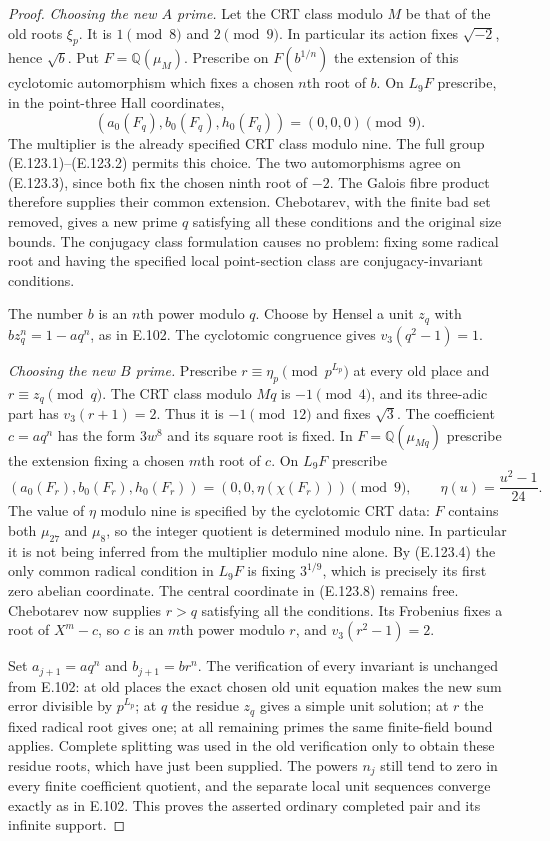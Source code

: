 \begin{proof}
\emph{Choosing the new $A$ prime.}
Let the CRT class modulo $M$ be that of the old roots $\xi_p$.
It is $1\pmod8$ and $2\pmod9$. In particular its action fixes
$\sqrt{-2}$, hence $\sqrt b$. Put $F=\mathbb Q(\mu_M)$.
Prescribe on $F(b^{1/n})$ the extension of this cyclotomic
automorphism which fixes a chosen $n$th root of $b$.
On $L_9F$ prescribe, in the point-three Hall coordinates,
\[
 (a_0(F_q),b_0(F_q),h_0(F_q))=(0,0,0)\pmod9.
 \tag{E.123.7}
\]
The multiplier is the already specified CRT class modulo nine.
The full group (E.123.1)--(E.123.2) permits this choice. The two
automorphisms agree on (E.123.3), since both fix the chosen ninth
root of $-2$. The Galois fibre product therefore supplies their
common extension. Chebotarev, with the finite bad set removed,
gives a new prime $q$ satisfying all these conditions and the
original size bounds. The conjugacy class formulation causes no
problem: fixing some radical root and having the specified local
point-section class are conjugacy-invariant conditions.

The number $b$ is an $n$th power modulo $q$. Choose by Hensel
a unit $z_q$ with $b z_q^n=1-aq^n$, as in E.102.
The cyclotomic congruence gives $v_3(q^2-1)=1$.

\emph{Choosing the new $B$ prime.}
Prescribe $r\equiv\eta_p\pmod{p^{L_p}}$ at every old place
and $r\equiv z_q\pmod q$. The CRT class modulo $Mq$ is
$-1\pmod4$, and its three-adic part has
$v_3(r+1)=2$. Thus it is $-1\pmod{12}$ and fixes $\sqrt3$.
The coefficient $c=aq^n$ has the form $3w^8$ and its square
root is fixed. In $F=\mathbb Q(\mu_{Mq})$ prescribe the
extension fixing a chosen $m$th root of $c$. On $L_9F$ prescribe
\[
 (a_0(F_r),b_0(F_r),h_0(F_r))
       =(0,0,\eta(\chi(F_r)))\pmod9,
 \qquad \eta(u)=\frac{u^2-1}{24}.
 \tag{E.123.8}
\]
The value of $\eta$ modulo nine is specified by the cyclotomic
CRT data: $F$ contains both $\mu_{27}$ and $\mu_8$, so the
integer quotient is determined modulo nine. In particular it is
not being inferred from the multiplier modulo nine alone.
By (E.123.4) the only common radical condition in $L_9F$ is
fixing $3^{1/9}$, which is precisely its first zero abelian
coordinate. The central coordinate in (E.123.8) remains free.
Chebotarev now supplies $r>q$ satisfying all the conditions.
Its Frobenius fixes a root of $X^m-c$, so $c$ is an $m$th
power modulo $r$, and $v_3(r^2-1)=2$.

Set $a_{j+1}=a q^n$ and $b_{j+1}=b r^n$.
The verification of every invariant is unchanged from E.102:
at old places the exact chosen old unit equation makes the new
sum error divisible by $p^{L_p}$; at $q$ the residue $z_q$
gives a simple unit solution; at $r$ the fixed radical root
gives one; at all remaining primes the same finite-field bound
applies. Complete splitting was used in the old verification
only to obtain these residue roots, which have just been
supplied. The powers $n_j$ still tend to zero in every finite
coefficient quotient, and the separate local unit sequences
converge exactly as in E.102. This proves the asserted ordinary
completed pair and its infinite support.


\end{proof}
